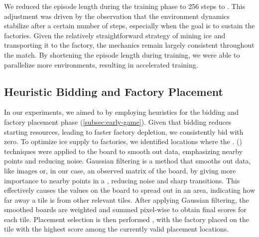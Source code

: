 \bigskip

\noindent We reduced the episode length during the training phase to 256 steps to . This adjustment was driven by the observation that the environment dynamics stabilize after a certain number of steps, especially when the goal is to sustain the factories. Given the relatively straightforward strategy of mining ice and transporting it to the factory, the mechanics remain largely consistent throughout the match. By shortening the episode length during training, we were able to parallelize more environments, resulting in accelerated training.

\subsection{Heuristic Bidding and Factory Placement}
\label{subsec:heur-bidding-factory}

\noindent In our experiments, we aimed to   by employing heuristics for the bidding and factory placement phase (\autoref{subsec:early-game}). Given that bidding reduces starting resources, leading to faster factory depletion, we consistently bid with zero. To optimize ice supply to factories, we identified locations where the .  (\cite{gaussianfilter}) techniques were applied to the board to smooth out data, emphasizing nearby points and reducing noise. Gaussian filtering is a method that smooths out data, like images or, in our case, an observed matrix of the board, by giving more importance to nearby points in a , reducing noise and sharp transitions. This effectively causes the values on the board to spread out in an area, indicating how far away a tile is from other relevant tiles. After applying Gaussian filtering, the smoothed boards are weighted and summed pixel-wise to obtain final scores for each tile. Placement selection is then performed , with the factory placed on the tile with the highest score among the currently valid placement locations.


